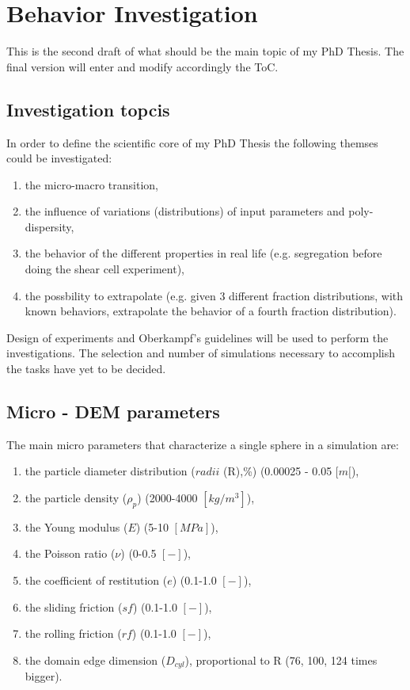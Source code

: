 
\section{Behavior Investigation}
\label{section:behaviorinvestigation}

This is the second draft of what should be the main topic of my PhD Thesis. The final version will enter and modify accordingly the ToC.

\subsection{Investigation topcis}
\label{subsection:investigationtopics}

In order to define the scientific core of my PhD Thesis the following themses could be investigated:
\begin{enumerate}
\item{the micro-macro transition,}
\item{the influence of variations (distributions) of input parameters and poly-dispersity,}
\item{the behavior of the different properties in real life (e.g. segregation before doing the shear cell experiment),}
\item{the possbility to extrapolate (e.g. given 3 different fraction distributions, with known behaviors, extrapolate the behavior of a fourth fraction distribution).}
\end{enumerate}
Design of experiments and Oberkampf's guidelines will be used to perform the investigations.
The selection and number of simulations necessary to accomplish the tasks have yet to be decided.

\subsection{Micro - DEM parameters}
\label{subsection:microparameters}

The main micro parameters that characterize a single sphere in a simulation are:

\begin{enumerate}[label=(\Alph*)]
\item{the particle diameter distribution ($radii$ (R),\%) (0.00025 - 0.05 $[m[$),}
\item{the particle density ($\rho_p$) (2000-4000 $[kg/m^3]$),}
\item{the Young modulus ($E$) (5-10 $[MPa]$),}
\item{the Poisson ratio ($\nu$) (0-0.5 $[-]$),}
\item{the coefficient of restitution ($e$) (0.1-1.0 $[-]$),}
\item{the sliding friction ($sf$) (0.1-1.0 $[-]$),}
\item{the rolling friction ($rf$) (0.1-1.0 $[-]$),}
\item{the domain edge dimension ($D_{cyl}$), proportional to R (76, 100, 124 times bigger).}
\end{enumerate}

